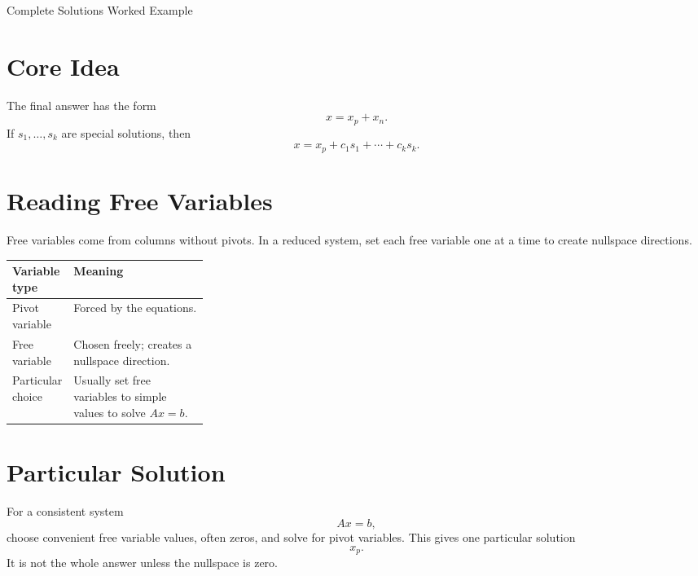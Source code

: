 \documentclass[10pt]{article}
\begin{document}
\begin{center}
{\LARGE Complete Solutions Worked Example\par}
\end{center}

\section{Core Idea}


The final answer has the form
\[
x=x_p+x_n.
\]
If \(s_1,\ldots,s_k\) are special solutions, then
\[
x=x_p+c_1s_1+\cdots+c_ks_k.
\]

\section{Reading Free Variables}

Free variables come from columns without pivots. In a reduced system, set each free variable one at a time to create nullspace directions.

\begin{center}
\small
\begin{tabularx}{\linewidth}{@{}L{0.28\linewidth}Y@{}}
\toprule
Variable type & Meaning \\
\midrule
Pivot variable & Forced by the equations. \\
Free variable & Chosen freely; creates a nullspace direction. \\
Particular choice & Usually set free variables to simple values to solve \(Ax=b\). \\
\bottomrule
\end{tabularx}
\end{center}

\section{Particular Solution}

For a consistent system
\[
Ax=b,
\]
choose convenient free variable values, often zeros, and solve for pivot variables. This gives one particular solution
\[
x_p.
\]
It is not the whole answer unless the nullspace is zero.
\end{document}
